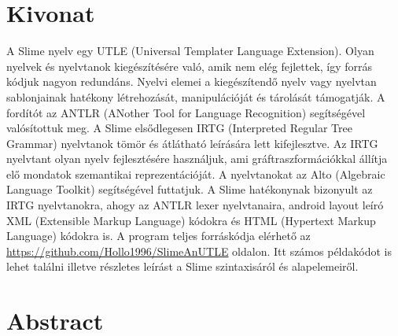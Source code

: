 \setcounter{page}{1}

\selecthungarian

\chapter*{Kivonat}


A Slime nyelv egy UTLE (Universal Templater Language Extension).
Olyan nyelvek és nyelvtanok kiegészítésére való, amik nem elég fejlettek, így forrás kódjuk nagyon redundáns.
Nyelvi elemei a kiegészítendő nyelv vagy nyelvtan sablonjainak hatékony létrehozását, manipulációját és tárolását támogatják.
A fordítót az ANTLR (ANother Tool for Language Recognition) segítségével valósítottuk meg.
A Slime elsődlegesen IRTG (Interpreted Regular Tree Grammar) nyelvtanok tömör  és átlátható leírására lett kifejlesztve.
Az IRTG nyelvtant olyan nyelv fejlesztésére használjuk, ami gráftraszformációkkal állítja elő mondatok szemantikai reprezentációját.
A nyelvtanokat az Alto (Algebraic Language Toolkit) segítségével futtatjuk.
A Slime hatékonynak bizonyult az IRTG nyelvtanokra, ahogy az ANTLR lexer nyelvtanaira, android layout leíró XML (Extensible Markup Language) kódokra  és HTML (Hypertext Markup Language) kódokra  is.
A program teljes forráskódja elérhető az \url{https://github.com/Hollo1996/SlimeAnUTLE} oldalon.
Itt számos példakódot is lehet találni illetve részletes leírást a Slime szintaxisáról és alapelemeiről.


\vfill
\selectenglish


\chapter*{Abstract}

